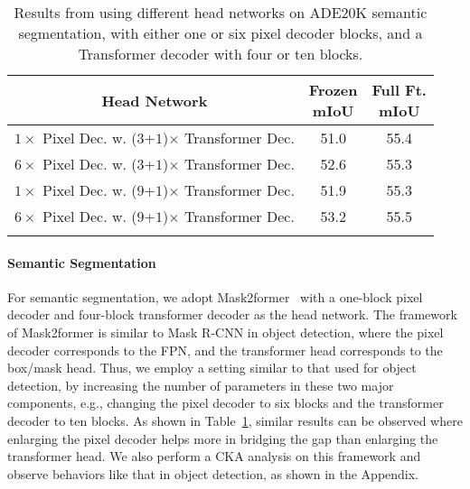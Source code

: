 \documentclass{article}
\begin{document}
\begin{table}[h]
               \centering
\addtolength{\tabcolsep}{3.0pt}
        \begin{tabular}{c|cc}
            \Xhline{1.0pt}
            Head Network& \makecell{Frozen\\mIoU} & \makecell{Full Ft.\\mIoU}\\
            \hline
            $1\times$ Pixel Dec. w. ($3$+$1$)$\times$ Transformer Dec. & 51.0 & 55.4 \\
            $6\times$ Pixel Dec. w. ($3$+$1$)$\times$ Transformer Dec.  & 52.6 & 55.3 \\
            $1\times$ Pixel Dec. w. ($9$+$1$)$\times$ Transformer Dec. & 51.9 & 55.3 \\
            $6\times$ Pixel Dec. w. ($9$+$1$)$\times$ Transformer Dec.  & 53.2 & 55.5 \\
          \Xhline{1.0pt}  
       \end{tabular}
       \caption{Results from using different head networks on ADE20K semantic segmentation, with either one or six pixel decoder blocks, and a Transformer decoder with four or ten blocks.}
    \label{tab:param_at_head_ade}
\end{table}

\paragraph{Semantic Segmentation}
For semantic segmentation, we adopt Mask2former~\cite{mask2former} with a one-block pixel decoder and four-block transformer decoder as the head network. The framework of Mask2former is similar to Mask R-CNN in object detection, where the pixel decoder corresponds to the FPN, and the transformer head corresponds to the box/mask head. Thus, we employ a setting similar to that used for object detection, by increasing the number of parameters in these two major components, e.g., changing the pixel decoder to six blocks and the transformer decoder to ten blocks. As shown in Table~\ref{tab:param_at_head_ade}, similar results can be observed where enlarging the pixel decoder helps more in bridging the gap than enlarging the transformer head. We also perform a CKA analysis on this framework and observe behaviors like that in object detection, as shown in the Appendix.
\end{document}
